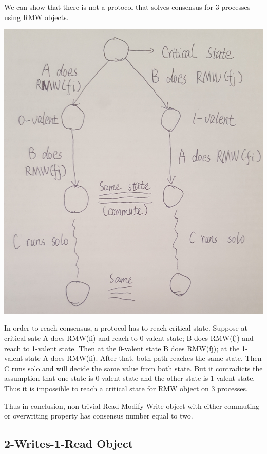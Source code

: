 \documentclass[twoside]{article}
\begin{document}
\begin{enumerate}
             We can show that there is not a protocol that solves consensus for 3 processes using RMW objects. \\
             \begin{center}
                 \includegraphics[scale=0.1]{figure1}
             \end{center} 
             In order to reach consensus, a protocol has to reach critical state. Suppose at critical sate A does RMW(fi) and reach to 0-valent state; B does RMW(fj) and reach to 1-valent state. Then at the 0-valent state B does RMW(fj); at the 1-valent state A does RMW(fi). After that, both path reaches the same state. Then C runs solo and will decide the same value from both state. But it contradicts the assumption that one state is 0-valent state and the other state is 1-valent state. Thus it is impossible to reach a critical state for RMW object on 3 processes. 
\end{enumerate}

Thus in conclusion, non-trivial Read-Modify-Write object with either commuting or overwriting property has consensus number equal to two.

\subsection{2-Writes-1-Read Object}
\end{document}

